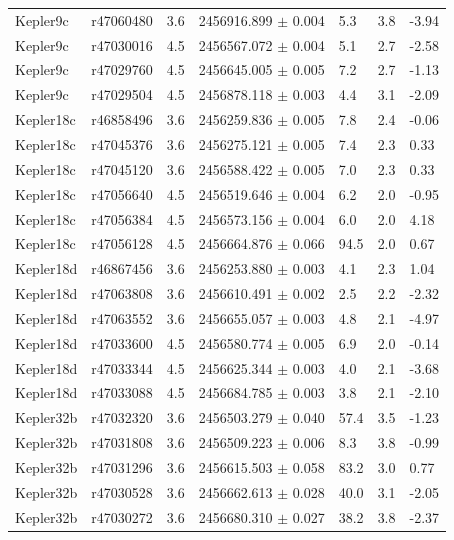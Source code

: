 {\begin{longtable}[h]{lllllll}
Kepler9c  &  r47060480 &     3.6 & 2456916.899 $\pm$ 0.004 &       5.3 & 3.8 & -3.94 \\
Kepler9c  &  r47030016 &     4.5 & 2456567.072 $\pm$ 0.004 &       5.1 & 2.7 & -2.58 \\
Kepler9c  &  r47029760 &     4.5 & 2456645.005 $\pm$ 0.005 &       7.2 & 2.7 & -1.13 \\
Kepler9c  &  r47029504 &     4.5 & 2456878.118 $\pm$ 0.003 &       4.4 & 3.1 & -2.09 \\
Kepler18c &  r46858496 &     3.6 & 2456259.836 $\pm$ 0.005 &       7.8 & 2.4 & -0.06 \\
Kepler18c &  r47045376 &     3.6 & 2456275.121 $\pm$ 0.005 &       7.4 & 2.3 &  0.33 \\
Kepler18c &  r47045120 &     3.6 & 2456588.422 $\pm$ 0.005 &       7.0 & 2.3 &  0.33 \\
Kepler18c &  r47056640 &     4.5 & 2456519.646 $\pm$ 0.004 &       6.2 & 2.0 & -0.95 \\
Kepler18c &  r47056384 &     4.5 & 2456573.156 $\pm$ 0.004 &       6.0 & 2.0 &  4.18 \\
Kepler18c &  r47056128 &     4.5 & 2456664.876 $\pm$ 0.066 &      94.5 & 2.0 &  0.67 \\
Kepler18d &  r46867456 &     3.6 & 2456253.880 $\pm$ 0.003 &       4.1 & 2.3 &  1.04 \\
Kepler18d &  r47063808 &     3.6 & 2456610.491 $\pm$ 0.002 &       2.5 & 2.2 & -2.32 \\
Kepler18d &  r47063552 &     3.6 & 2456655.057 $\pm$ 0.003 &       4.8 & 2.1 & -4.97 \\
Kepler18d &  r47033600 &     4.5 & 2456580.774 $\pm$ 0.005 &       6.9 & 2.0 & -0.14 \\
Kepler18d &  r47033344 &     4.5 & 2456625.344 $\pm$ 0.003 &       4.0 & 2.1 & -3.68 \\
Kepler18d &  r47033088 &     4.5 & 2456684.785 $\pm$ 0.003 &       3.8 & 2.1 & -2.10 \\
Kepler32b &  r47032320 &     3.6 & 2456503.279 $\pm$ 0.040 &      57.4 & 3.5 & -1.23 \\
Kepler32b &  r47031808 &     3.6 & 2456509.223 $\pm$ 0.006 &       8.3 & 3.8 & -0.99 \\
Kepler32b &  r47031296 &     3.6 & 2456615.503 $\pm$ 0.058 &      83.2 & 3.0 &  0.77 \\
Kepler32b &  r47030528 &     3.6 & 2456662.613 $\pm$ 0.028 &      40.0 & 3.1 & -2.05 \\
Kepler32b &  r47030272 &     3.6 & 2456680.310 $\pm$ 0.027 &      38.2 & 3.8 & -2.37 \\

\end{longtable}}
